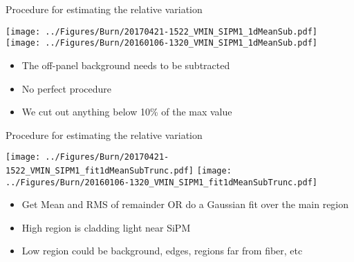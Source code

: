 \documentclass[compress,8pt]{beamer} %
\begin{document}
\begin{frame}{Procedure for estimating the relative variation}
\begin{adjustwidth}{-3em}{-3em}
\begin{center}
\texttt{[image: ../Figures/Burn/20170421-1522\_VMIN\_SIPM1\_1dMeanSub.pdf]}
\texttt{[image: ../Figures/Burn/20160106-1320\_VMIN\_SIPM1\_1dMeanSub.pdf]}
\end{center}
\end{adjustwidth}
\begin{itemize}
\item The off-panel background needs to be subtracted
\item No perfect procedure
\item We cut out anything below 10\% of the max value
\end{itemize}
\end{frame}

\begin{frame}{Procedure for estimating the relative variation}
\begin{adjustwidth}{-3em}{-3em}
\begin{center}
\texttt{[image: ../Figures/Burn/20170421-1522\_VMIN\_SIPM1\_fit1dMeanSubTrunc.pdf]}
\texttt{[image: ../Figures/Burn/20160106-1320\_VMIN\_SIPM1\_fit1dMeanSubTrunc.pdf]}
\end{center}
\end{adjustwidth}
\begin{itemize}
\item Get Mean and RMS of remainder OR do a Gaussian fit over the main region
\item High region is cladding light near SiPM
\item Low region could be background, edges, regions far from fiber, etc
\end{itemize}
\end{frame}
\end{document}
